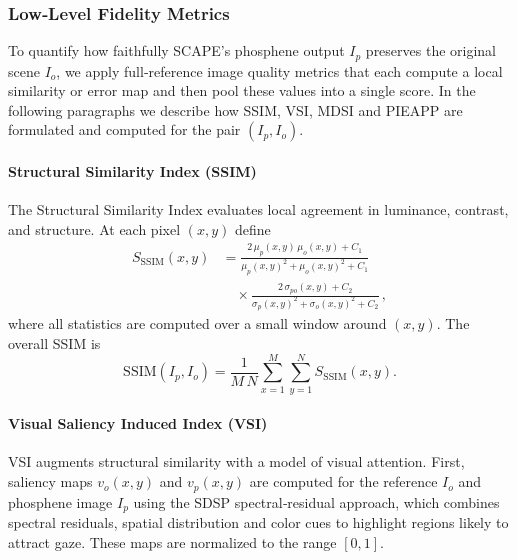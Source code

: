 \subsubsection{Low‐Level Fidelity Metrics}
To quantify how faithfully SCAPE’s phosphene output \(I_p\) preserves the original scene \(I_o\), we apply full‐reference image quality metrics that each compute a local similarity or error map and then pool these values into a single score.  In the following paragraphs we describe how SSIM, VSI, MDSI and PIEAPP are formulated and computed for the pair \((I_p,I_o)\).  


\paragraph{Structural Similarity Index (SSIM)}  
The Structural Similarity Index \cite{Wang2004} evaluates local agreement in luminance, contrast, and structure.  At each pixel \((x,y)\) define
\begin{align*}
S_{\mathrm{SSIM}}(x,y)
&= \frac{2\,\mu_p(x,y)\,\mu_o(x,y) + C_1}
       {\mu_p(x,y)^2 + \mu_o(x,y)^2 + C_1}\\
&\quad\times
    \frac{2\,\sigma_{po}(x,y) + C_2}
         {\sigma_p(x,y)^2 + \sigma_o(x,y)^2 + C_2}\,,
\end{align*}
where all statistics are computed over a small window around \((x,y)\).  The overall SSIM is
\[
\mathrm{SSIM}(I_p,I_o)
= \frac{1}{M\,N}
  \sum_{x=1}^{M}\sum_{y=1}^{N}
  S_{\mathrm{SSIM}}(x,y).
\]




\paragraph{Visual Saliency Induced Index (VSI)}  
VSI \cite{Zhang2014} augments structural similarity with a model of visual attention.  First, saliency maps \(v_o(x,y)\) and \(v_p(x,y)\) are computed for the reference \(I_o\) and phosphene image \(I_p\) using the SDSP spectral‐residual approach, which combines spectral residuals, spatial distribution and color cues to highlight regions likely to attract gaze.  These maps are normalized to the range \([0,1]\).  


